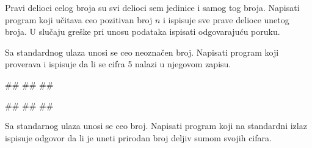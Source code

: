 \begin{Exercise}[label=v1.3_14] 
Pravi delioci celog broja su svi delioci sem jedinice i samog tog
broja.  Napisati program koji učitava ceo pozitivan broj $n$ i
ispisuje sve prave delioce unetog broja. U slučaju greške pri unosu
podataka ispisati odgovarajuću poruku.  \\
\end{Exercise}
\begin{Answer}[ref=v1.3_14]
\end{Answer}


\begin{Exercise}[label=p1.3_04] 
 Sa standardnog ulaza unosi se ceo neoznačen broj. Napisati program
 koji proverava i ispisuje da li se cifra 5 nalazi u njegovom zapisu.
 
\begin{miditest}
\begin{upotreba}{1}
#\naslovInt#
##
##
\end{upotreba}
\end{miditest}
\begin{miditest}
\begin{upotreba}{2}
#\naslovInt#
##
##
\end{upotreba}
\end{miditest}
\end{Exercise}
\begin{Answer}[ref=p1.3_04]
\end{Answer}


\begin{Exercise}[label=p1.7_] 
Sa standarnog ulaza unosi se ceo broj. Napisati program koji na
standardni izlaz ispisuje odgovor da li je uneti prirodan broj deljiv
sumom svojih cifara.\\ 
\end{Exercise}
\begin{Answer}[ref=p1.7_]
\end{Answer}



